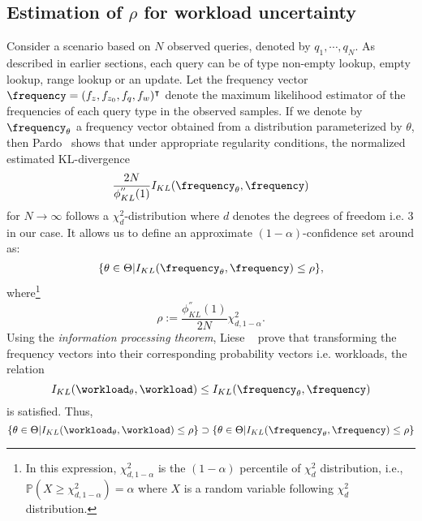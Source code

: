 \subsection{Estimation of $\rho$ for workload uncertainty}\label{sec:rhow}
Consider a scenario based on $N$ observed queries, denoted by $q_1, \cdots,
q_N$.
As described in earlier sections, each query can be of type non-empty lookup,
    empty lookup, range lookup or an update.
Let the frequency vector $\frequency = (f_z, f_{z_{0}}, f_q, f_w)^\intercal$ denote the 
    maximum likelihood estimator of the frequencies of each query type in the observed samples. 
If we denote by $\frequency_\theta$ a frequency vector obtained from a
distribution parameterized by $\theta$, then 
    Pardo~\cite{pardo2018statistical} shows that under appropriate regularity 
    conditions, the normalized estimated KL-divergence
\begin{equation}
    \frac{2N}{\phi_{KL}^{''}(1)}I_{KL}(\frequency_\theta, \frequency)
\end{equation}
for $N \rightarrow \infty$ follows a $\chi_{d}^{2}$-distribution where $d$
denotes the degrees of freedom i.e. 3 in our case.
It allows us to define an approximate $(1 - \alpha)$-confidence set around
{\frequency} as:
\begin{equation}
    \{ \theta \in \Theta | I_{KL}(\frequency_\theta, \frequency) \leq \rho \},
\end{equation}
where\footnote{In this expression, $\chi_{d, 1 - \alpha}^{2}$ is the $(1 -
\alpha)$ percentile of $\chi_{d}^2$ distribution, i.e., $\mathbb{P}( X \geq
\chi_{d, 1 - \alpha}^{2}) = \alpha$ where $X$ is a random variable following
$\chi_{d}^{2}$ distribution.} 
\begin{equation}
    \rho := \frac{\phi_{KL}^{''}(1)}{2N}\chi_{d, 1 - \alpha}^{2}.
\end{equation}
Using the \emph{information processing theorem}, Liese {\etal}~\cite{Liese2006-iv} 
    prove that transforming the frequency vectors
    into their corresponding probability vectors i.e. workloads, the relation
\begin{equation}
    I_{KL}(\workload_\theta, \workload) \leq I_{KL}(\frequency_\theta,
    \frequency)
\end{equation}
is satisfied.
Thus,
\begin{equation}
    \{\theta \in \Theta | I_{KL}(\workload_\theta, \workload) \leq \rho\} \supset
    \{\theta \in \Theta | I_{KL}(\frequency_\theta, \frequency) \leq \rho\}
\end{equation}
